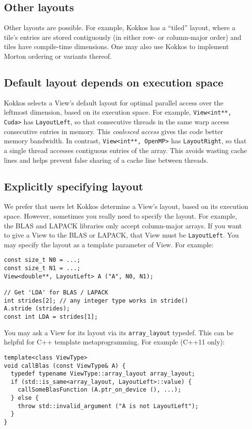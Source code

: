 \subsection{Other layouts}\label{SS:Views::Layout::Other}

Other layouts are possible.  For example, Kokkos has a ``tiled''
layout, where a tile's entries are stored contiguously (in either row-
or column-major order) and tiles have compile-time dimensions.  One
may also use Kokkos to implement Morton ordering or variants thereof.

\subsection{Default layout depends on execution space}\label{SS:Views:Layout:Default}

Kokkos selects a View's default layout for optimal parallel access
over the leftmost dimension, based on its execution space.  For
example, \lstinline!View<int**, Cuda>! has \lstinline!LayoutLeft!, so that
consecutive threads in the same warp access consecutive entries in
memory.  This \emph{coalesced access} gives the code better memory
bandwidth.  In contrast, \lstinline!View<int**, OpenMP>! has
\lstinline!LayoutRight!, so that a single thread accesses contiguous
entries of the array.  This avoids wasting cache lines and helps
prevent false sharing of a cache line between threads.

\subsection{Explicitly specifying layout}\label{SS:Views:Layout:Explicit}

We prefer that users let Kokkos determine a View's layout, based on
its execution space.  However, sometimes you really need to specify
the layout.  For example, the BLAS and LAPACK libraries only accept
column-major arrays.  If you want to give a View to the BLAS or
LAPACK, that View must be \lstinline!LayoutLeft!.  You may specify the
layout as a template parameter of View.  For example:
\begin{lstlisting}
const size_t N0 = ...;
const size_t N1 = ...;
View<double**, LayoutLeft> A ("A", N0, N1);

// Get 'LDA' for BLAS / LAPACK
int strides[2]; // any integer type works in stride()
A.stride (strides);
const int LDA = strides[1];
\end{lstlisting}
You may ask a View for its layout via its \lstinline!array_layout! typedef.
This can be helpful for C++ template metaprogramming.  For example
(C++11 only):
\begin{lstlisting}
template<class ViewType>
void callBlas (const ViewType& A) {
  typedef typename ViewType::array_layout array_layout;
  if (std::is_same<array_layout, LayoutLeft>::value) {
    callSomeBlasFunction (A.ptr_on_device (), ...);
  } else {
    throw std::invalid_argument ("A is not LayoutLeft");
  }
}
\end{lstlisting}

